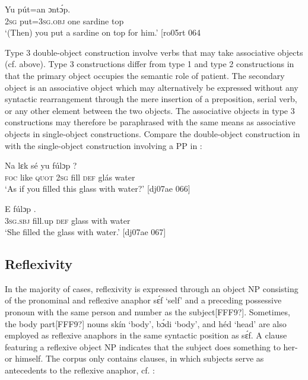 \ea%
    \label{ex:key:1221}
    \gll Yu  pút=an          ɔntɔ́p.\\
\textsc{2sg}  put=\textsc{3sg.obj}  one    sardine  top\\

\glt ‘(Then) you put a sardine on top for him.’ [ro05rt 064
\z

Type 3 double-object construction involve verbs that may take associative objects (cf.  above). Type 3 constructions differ from type 1 and type 2 constructions in that the primary object occupies the semantic role of patient. The secondary object is an associative object which may alternatively be expressed without any syntactic rearrangement through the mere insertion of a preposition, serial verb, or any other element between the two objects. The associative objects in type 3 constructions may therefore be paraphrased with the same means as associative objects in single-object constructions. Compare the double-object construction in  with the single-object construction involving a PP in :


\ea%
    \label{ex:key:1222}
    \gll Na  lɛk  sé    yu  fúlɔp      ?\\
\textsc{foc}  like  \textsc{quot}    \textsc{2sg}  fill    \textsc{def}  glás  water\\

\glt ‘As if you filled this glass with water?’ [dj07ae 066]
\z


\ea%
    \label{ex:key:1223}
    \gll E    fúlɔp            .\\
\textsc{3sg.sbj}  fill.up  \textsc{def}  glass  with    water   \\
\glt ‘She filled the glass with water.’ [dj07ae 067]
\z

\subsection{Reflexivity}\label{sec:9.3.5}

In the majority of cases, reflexivity is expressed through an object NP consisting of the pronominal and reflexive anaphor sɛ́f ‘self’ and a preceding possessive pronoun with the same person and number as the subject[FFF9?]. Sometimes, the body part[FFF9?] nouns skín ‘body’, bɔ́di ‘body’, and héd ‘head’ are also employed as reflexive anaphors in the same syntactic position as sɛ́f. A clause featuring a reflexive object NP indicates that the subject does something to her- or himself. The corpus only contains clauses, in which subjects serve as antecedents to the reflexive anaphor, cf. :


